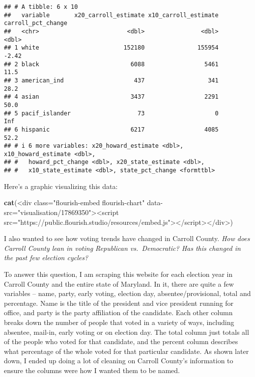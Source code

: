 \documentclass[
]{article}
\newenvironment{Shaded}{\begin{snugshade}}{\end{snugshade}}
\newcommand{\FunctionTok}[1]{\textcolor[rgb]{0.13,0.29,0.53}{\textbf{#1}}}
\newcommand{\NormalTok}[1]{#1}
\newcommand{\StringTok}[1]{\textcolor[rgb]{0.31,0.60,0.02}{#1}}
\begin{document}
\begin{verbatim}
## # A tibble: 6 x 10
##   variable       x20_carroll_estimate x10_carroll_estimate carroll_pct_change
##   <chr>                         <dbl>                <dbl>              <dbl>
## 1 white                        152180               155954              -2.42
## 2 black                          6088                 5461              11.5 
## 3 american_ind                    437                  341              28.2 
## 4 asian                          3437                 2291              50.0 
## 5 pacif_islander                   73                    0             Inf   
## 6 hispanic                       6217                 4085              52.2 
## # i 6 more variables: x20_howard_estimate <dbl>, x10_howard_estimate <dbl>,
## #   howard_pct_change <dbl>, x20_state_estimate <dbl>,
## #   x10_state_estimate <dbl>, state_pct_change <formttbl>
\end{verbatim}

Here's a graphic visualizing this data:

\begin{Shaded}
\begin{Highlighting}[]
\FunctionTok{cat}\NormalTok{(}\StringTok{\textquotesingle{}\textless{}div class="flourish{-}embed flourish{-}chart" data{-}src="visualisation/17869350"\textgreater{}\textless{}script src="https://public.flourish.studio/resources/embed.js"\textgreater{}\textless{}/script\textgreater{}\textless{}/div\textgreater{}\textquotesingle{}}\NormalTok{)}
\end{Highlighting}
\end{Shaded}

I also wanted to see how voting trends have changed in Carroll County.
\emph{How does Carroll County lean in voting Republican vs.~Democratic?
Has this changed in the past few election cycles?}

To answer this question, I am scraping this website for each election
year in Carroll County and the entire state of Maryland. In it, there
are quite a few variables -- name, party, early voting, election day,
absentee/provisional, total and percentage. Name is the title of the
president and vice president running for office, and party is the party
affiliation of the candidate. Each other column breaks down the number
of people that voted in a variety of ways, including absentee, mail-in,
early voting or on election day. The total column just totals all of the
people who voted for that candidate, and the percent column describes
what percentage of the whole voted for that particular candidate. As
shown later down, I ended up doing a lot of cleaning on Carroll County's
information to ensure the columns were how I wanted them to be named.
\end{document}
